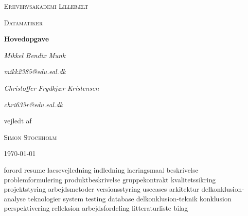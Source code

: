 \documentclass[a4paper, 11pt, danish]{article}
\begin{document}
\begin{titlepage}
    \centering
    {\scshape\LARGE Erhvervsakademi Lillebælt \par}
    \vspace{1cm}
    {\scshape\Large Datamatiker\par}
    \vspace{1.5cm}
    {\huge\bfseries Hovedopgave\par}
    \vspace{2cm}
    {\Large\itshape Mikkel Bendix Munk\par}
    {\small\itshape mikk2385@edu.eal.dk\par}
    {\Large\itshape Christoffer Frydkjær Kristensen\par}
    {\small\itshape chri635r@edu.eal.dk\par}
    \vfill
    vejledt af\par
    \textsc{Simon Stochholm}

    \vfill

    {\large \today\par}
\end{titlepage}
{forord}
{resume}
\newpage
\tableofcontents{}
\newpage
{laesevejledning}
{indledning}
{laeringsmaal}
{beskrivelse}
{problemformulering}
{produktbeskrivelse}
{gruppekontrakt}
{kvalitetssikring}
{projektstyring}
{arbejdsmetoder}
{versionsstyring}
{usecases}
{arkitektur}
{delkonklusion-analyse}
\newpage
{teknologier}
{system}
{testing}
{database}
{delkonklusion-teknik}
\newpage
{konklusion}
{perspektivering}
{refleksion}
{arbejdsfordeling}
{litteraturliste}
{bilag}
\end{document}
